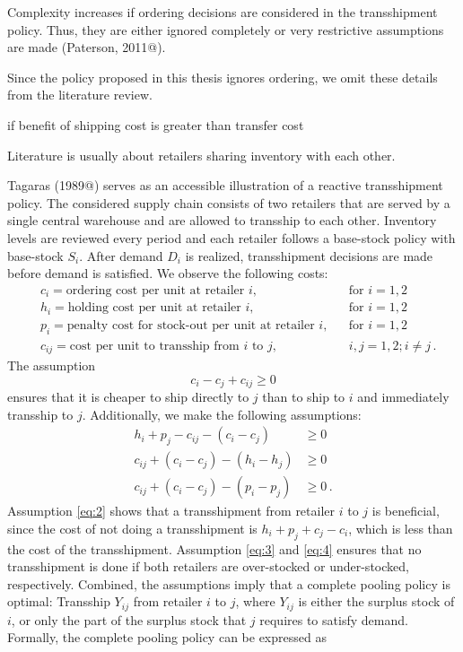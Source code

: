 \documentclass[../../main.tex]{subfiles}
\begin{document}
Complexity increases if ordering decisions are considered in the transshipment policy. Thus, they are either ignored completely or very restrictive assumptions are made (Paterson, 2011@). 

Since the policy proposed in this thesis ignores ordering, we omit these details from the literature review.

if benefit of shipping cost is greater than transfer cost

Literature is usually about retailers sharing inventory with each other. 

Tagaras (1989@) serves as an accessible illustration of a reactive transshipment policy. The considered supply chain consists of two retailers that are served by a single central warehouse and are allowed to transship to each other. Inventory levels are reviewed every period and each retailer follows a base-stock policy with base-stock \(S_i\). After demand $D_i$ is realized, transshipment decisions are made before demand is satisfied. We observe the following costs:
%
\begin{align*}
    &c_i = \text{ordering cost per unit at retailer $i$}, && \text{for $i = 1,2$}  \\ 
    &h_i = \text{holding cost per unit at retailer $i$}, && \text{for $i = 1,2$}  \\ 
    &p_i = \text{penalty cost for stock-out per unit at retailer $i$}, && \text{for $i = 1,2$}  \\ 
    &c_{ij} = \text{cost per unit to transship from $i$ to $j$}, && \text{$i,j = 1,2; i \neq j\,$.}
\end{align*}
%
The assumption
%
\begin{equation}
    c_i - c_j + c_{ij} \geq 0\label{eq:1}
\end{equation}
%
ensures that it is cheaper to ship directly to \(j\) than to ship to \(i\) and immediately transship to \(j\). Additionally, we make the following assumptions: 
%
\begin{align}
    h_i + p_j - c_{ij} - (c_i - c_j) &\geq 0\label{eq:2} \\
    c_{ij} + (c_i - c_j) - (h_i - h_j) &\geq 0\label{eq:3} \\
    c_{ij} + (c_i - c_j) - (p_i - p_j) &\geq 0\label{eq:4}\,.
\end{align}
%
Assumption \eqref{eq:2} shows that a transshipment from retailer \(i\) to \(j\) is beneficial, since the cost of not doing a transshipment is $h_i + p_j + c_j - c_i$, which is less than the cost of the transshipment. Assumption \eqref{eq:3} and \eqref{eq:4} ensures that no transshipment is done if both retailers are over-stocked or under-stocked, respectively. Combined, the assumptions imply that a complete pooling policy is optimal: Transship $Y_{ij}$ from retailer $i$ to $j$, where $Y_{ij}$ is either the surplus stock of $i$, or only the part of the surplus stock that $j$ requires to satisfy demand. Formally, the complete pooling policy can be expressed as
\end{document}
